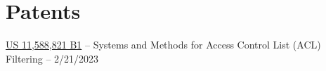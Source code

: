 \documentclass[10pt]{deedy-resume-reversed}
\begin{document}
\begin{minipage}[t]{1.0\textwidth}

\section{Patents}
\href{https://image-ppubs.uspto.gov/dirsearch-public/print/downloadPdf/11588821}{US 11,588,821 B1} 
– Systems and Methods for Access Control List (ACL) Filtering – 2/21/2023 \\
\sectionsep

\end{minipage}
\end{document}
